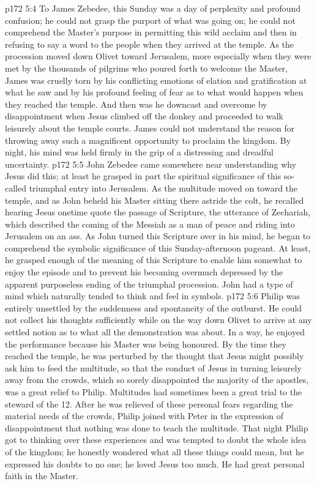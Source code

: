 \vs p172 5:4 To James Zebedee, this Sunday was a day of perplexity and profound confusion; he could not grasp the purport of what was going on; he could not comprehend the Master’s purpose in permitting this wild acclaim and then in refusing to say a word to the people when they arrived at the temple. As the procession moved down Olivet toward Jerusalem, more especially when they were met by the thousands of pilgrims who poured forth to welcome the Master, James was cruelly torn by his conflicting emotions of elation and gratification at what he saw and by his profound feeling of fear as to what would happen when they reached the temple. And then was he downcast and overcome by disappointment when Jesus climbed off the donkey and proceeded to walk leisurely about the temple courts. James could not understand the reason for throwing away such a magnificent opportunity to proclaim the kingdom. By night, his mind was held firmly in the grip of a distressing and dreadful uncertainty.
\vs p172 5:5 John Zebedee came somewhere near understanding why Jesus did this; at least he grasped in part the spiritual significance of this so\hyp{}called triumphal entry into Jerusalem. As the multitude moved on toward the temple, and as John beheld his Master sitting there astride the colt, he recalled hearing Jesus onetime quote the passage of Scripture, the utterance of Zechariah, which described the coming of the Messiah as a man of peace and riding into Jerusalem on an ass. As John turned this Scripture over in his mind, he began to comprehend the symbolic significance of this Sunday\hyp{}afternoon pageant. At least, he grasped enough of the meaning of this Scripture to enable him somewhat to enjoy the episode and to prevent his becoming overmuch depressed by the apparent purposeless ending of the triumphal procession. John had a type of mind which naturally tended to think and feel in symbols.
\vs p172 5:6 \pc Philip was entirely unsettled by the suddenness and spontaneity of the outburst. He could not collect his thoughts sufficiently while on the way down Olivet to arrive at any settled notion as to what all the demonstration was about. In a way, he enjoyed the performance because his Master was being honoured. By the time they reached the temple, he was perturbed by the thought that Jesus might possibly ask him to feed the multitude, so that the conduct of Jesus in turning leisurely away from the crowds, which so sorely disappointed the majority of the apostles, was a great relief to Philip. Multitudes had sometimes been a great trial to the steward of the 12. After he was relieved of these personal fears regarding the material needs of the crowds, Philip joined with Peter in the expression of disappointment that nothing was done to teach the multitude. That night Philip got to thinking over these experiences and was tempted to doubt the whole idea of the kingdom; he honestly wondered what all these things could mean, but he expressed his doubts to no one; he loved Jesus too much. He had great personal faith in the Master.
